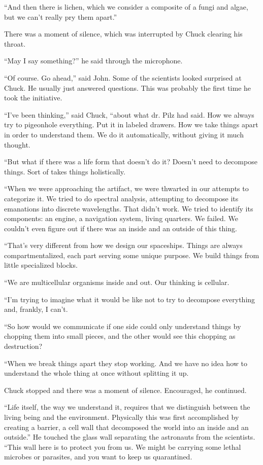 \documentclass[12pt]{book}
\begin{document}
``And then there is lichen, which we consider a composite of a fungi and algae, but we can't really pry them apart.''

There was a moment of silence, which was interrupted by Chuck clearing his throat.

``May I say something?'' he said through the microphone.

``Of course. Go ahead,'' said John. Some of the scientists looked surprised at Chuck. He usually just answered questions. This was probably the first time he took the initiative.

``I've been thinking,'' said Chuck, ``about what dr. Pilz had said. How we always try to pigeonhole everything. Put it in labeled drawers. How we take things apart in order to understand them. We do it automatically, without giving it much thought.

``But what if there was a life form that doesn't do it? Doesn't need to decompose things. Sort of takes things holistically.

``When we were approaching the artifact, we were thwarted in our attempts to categorize it. We tried to do spectral analysis, attempting to decompose its emanations into discrete wavelengths. That didn't work. We tried to identify its components: an engine, a navigation system, living quarters. We failed. We couldn't even figure out if there was an inside and an outside of this thing.

``That's very different from how we design our spaceships. Things are always compartmentalized, each part serving some unique purpose. We build things from little specialized blocks. 

``We are multicellular organisms inside and out. Our thinking is cellular. 

``I'm trying to imagine what it would be like not to try to decompose everything and, frankly, I can't. 

``So how would we communicate if one side could only understand things by chopping them into small pieces, and the other would see this chopping as destruction?

``When we break things apart they stop working. And we have no idea how to understand the whole thing at once without splitting it up.

Chuck stopped and there was a moment of silence. Encouraged, he continued.

``Life itself, the way we understand it, requires that we distinguish between the living being and the environment. Physically this was first accomplished by creating a barrier, a cell wall that decomposed the world into an inside and an outside.'' He touched the glass wall separating the astronauts from the scientists. ``This wall here is to protect you from us. We might be carrying some lethal microbes or parasites, and you want to keep us quarantined.
\end{document}

